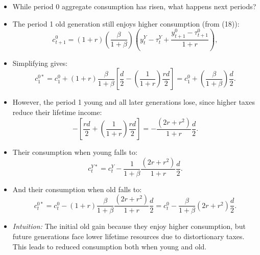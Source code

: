 \documentclass[12pt]{article}
\begin{document}
\begin{itemize}
  \item While period 0 aggregate consumption has risen, what happens next periods?

  \item The period 1 old generation still enjoys higher consumption (from (18)):
  \[
  c_{t+1}^{0} = (1+r)\left(\frac{\beta}{1+\beta}\right)\left(y_{t}^{Y} - \tau_{t}^{Y} + \frac{y_{t+1}^{0} - \tau_{t+1}^{0}}{1+r}\right),
  \]

  \item Simplifying gives:
  \[
  c_{1}^{0*} = c_{1}^{0} + (1+r)\frac{\beta}{1+\beta}\left[\frac{d}{2} - \left(\frac{1}{1+r}\right)\frac{rd}{2}\right]
              = c_{1}^{0} + \left(\frac{\beta}{1+\beta}\right)\frac{d}{2}. \tag{27}
  \]

  \item However, the period 1 young and all later generations lose, since higher taxes reduce their lifetime income:
  \[
  -\left[\frac{rd}{2} + \left(\frac{1}{1+r}\right)\frac{rd}{2}\right]
  = -\frac{(2r+r^{2})}{1+r}\frac{d}{2}.
  \]

  \item Their consumption when young falls to:
  \[
  c_{t}^{Y*} = c_{t}^{Y} - \frac{1}{1+\beta}\frac{(2r+r^{2})}{1+r}\frac{d}{2}. \tag{28}
  \]

  \item And their consumption when old falls to:
  \[
  c_{t}^{0*} = c_{t}^{0} - (1+r)\frac{\beta}{1+\beta}\frac{(2r+r^{2})}{1+r}\frac{d}{2}
            = c_{t}^{0} - \frac{\beta}{1+\beta}(2r+r^{2})\frac{d}{2}. \tag{29}
  \]

  \item \textit{Intuition:} The initial old gain because they enjoy higher consumption, but future generations face lower lifetime resources due to distortionary taxes. This leads to reduced consumption both when young and old.
\end{itemize}
\end{document}
